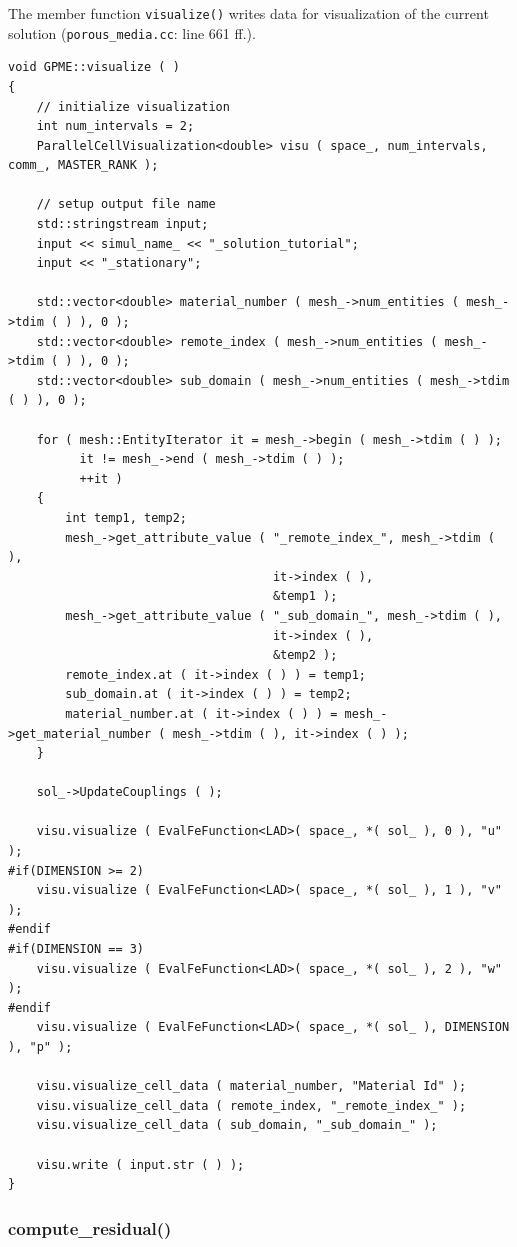 \documentclass{article}
\begin{document}
The member function \texttt{visualize()} writes data for visualization of the current solution (\texttt{porous\_media.cc}: line 661 ff.).

\begin{lstlisting}[firstnumber=661]
void GPME::visualize ( )
{
    // initialize visualization
    int num_intervals = 2;
    ParallelCellVisualization<double> visu ( space_, num_intervals, comm_, MASTER_RANK );

    // setup output file name
    std::stringstream input;
    input << simul_name_ << "_solution_tutorial";
    input << "_stationary";

    std::vector<double> material_number ( mesh_->num_entities ( mesh_->tdim ( ) ), 0 );
    std::vector<double> remote_index ( mesh_->num_entities ( mesh_->tdim ( ) ), 0 );
    std::vector<double> sub_domain ( mesh_->num_entities ( mesh_->tdim ( ) ), 0 );

    for ( mesh::EntityIterator it = mesh_->begin ( mesh_->tdim ( ) );
          it != mesh_->end ( mesh_->tdim ( ) );
          ++it )
    {
        int temp1, temp2;
        mesh_->get_attribute_value ( "_remote_index_", mesh_->tdim ( ),
                                     it->index ( ),
                                     &temp1 );
        mesh_->get_attribute_value ( "_sub_domain_", mesh_->tdim ( ),
                                     it->index ( ),
                                     &temp2 );
        remote_index.at ( it->index ( ) ) = temp1;
        sub_domain.at ( it->index ( ) ) = temp2;
        material_number.at ( it->index ( ) ) = mesh_->get_material_number ( mesh_->tdim ( ), it->index ( ) );
    }

    sol_->UpdateCouplings ( );

    visu.visualize ( EvalFeFunction<LAD>( space_, *( sol_ ), 0 ), "u" );
#if(DIMENSION >= 2)
    visu.visualize ( EvalFeFunction<LAD>( space_, *( sol_ ), 1 ), "v" );
#endif
#if(DIMENSION == 3)
    visu.visualize ( EvalFeFunction<LAD>( space_, *( sol_ ), 2 ), "w" );
#endif
    visu.visualize ( EvalFeFunction<LAD>( space_, *( sol_ ), DIMENSION ), "p" );

    visu.visualize_cell_data ( material_number, "Material Id" );
    visu.visualize_cell_data ( remote_index, "_remote_index_" );
    visu.visualize_cell_data ( sub_domain, "_sub_domain_" );

    visu.write ( input.str ( ) );
}
\end{lstlisting}


\subsubsection{compute\_residual()}
\label{sec:residual}
\end{document}
